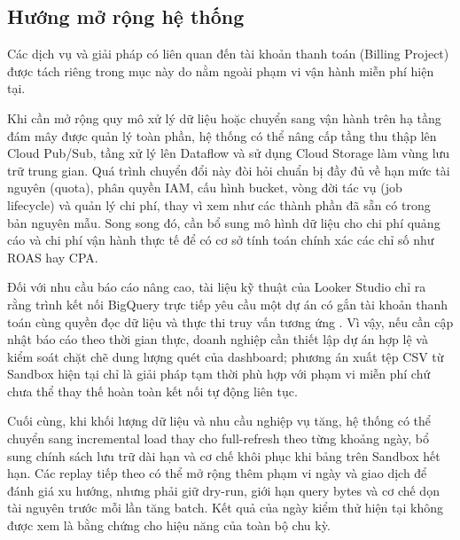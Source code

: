 \subsection{Hướng mở rộng hệ thống}
\label{sec:extensions}

Các dịch vụ và giải pháp có liên quan đến tài khoản thanh toán (Billing Project) được tách riêng trong mục này do nằm ngoài phạm vi vận hành miễn phí hiện tại.\medskip

Khi cần mở rộng quy mô xử lý dữ liệu hoặc chuyển sang vận hành trên hạ tầng đám mây được quản lý toàn phần, hệ thống có thể nâng cấp tầng thu thập lên Cloud Pub/Sub, tầng xử lý lên Dataflow và sử dụng Cloud Storage làm vùng lưu trữ trung gian. Quá trình chuyển đổi này đòi hỏi chuẩn bị đầy đủ về hạn mức tài nguyên (quota), phân quyền IAM, cấu hình bucket, vòng đời tác vụ (job lifecycle) và quản lý chi phí, thay vì xem như các thành phần đã sẵn có trong bản nguyên mẫu. Song song đó, cần bổ sung mô hình dữ liệu cho chi phí quảng cáo và chi phí vận hành thực tế để có cơ sở tính toán chính xác các chỉ số như ROAS hay CPA.\medskip

Đối với nhu cầu báo cáo nâng cao, tài liệu kỹ thuật của Looker Studio chỉ ra rằng trình kết nối BigQuery trực tiếp yêu cầu một dự án có gắn tài khoản thanh toán cùng quyền đọc dữ liệu và thực thi truy vấn tương ứng \parencite{looker-bigquery}. Vì vậy, nếu cần cập nhật báo cáo theo thời gian thực, doanh nghiệp cần thiết lập dự án hợp lệ và kiểm soát chặt chẽ dung lượng quét của dashboard; phương án xuất tệp CSV từ Sandbox hiện tại chỉ là giải pháp tạm thời phù hợp với phạm vi miễn phí chứ chưa thể thay thế hoàn toàn kết nối tự động liên tục.\medskip

Cuối cùng, khi khối lượng dữ liệu và nhu cầu nghiệp vụ tăng, hệ thống có thể chuyển sang incremental load thay cho full-refresh theo từng khoảng ngày, bổ sung chính sách lưu trữ dài hạn và cơ chế khôi phục khi bảng trên Sandbox hết hạn. Các replay tiếp theo có thể mở rộng thêm phạm vi ngày và giao dịch để đánh giá xu hướng, nhưng phải giữ dry-run, giới hạn query bytes và cơ chế dọn tài nguyên trước mỗi lần tăng batch. Kết quả của ngày kiểm thử hiện tại không được xem là bằng chứng cho hiệu năng của toàn bộ chu kỳ.\medskip